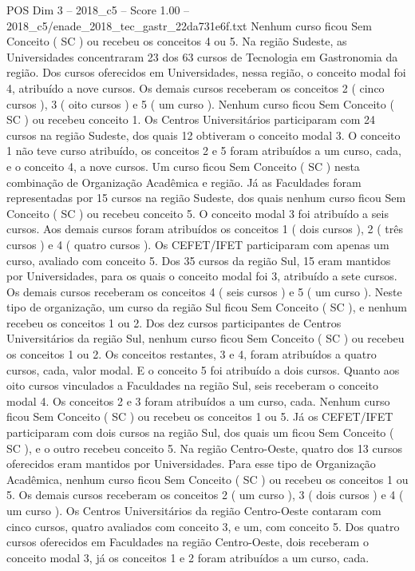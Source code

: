 \begin{textsample}{POS Dim 3 – 2018\_c5 – Score 1.00 – 2018\_c5/enade\_2018\_tec\_gastr\_22da731e6f.txt}
Nenhum curso ficou Sem Conceito ( SC ) ou recebeu os conceitos 4 ou 5.
Na região Sudeste, as Universidades concentraram 23 dos 63 cursos de Tecnologia em Gastronomia da região.
Dos cursos oferecidos em Universidades, nessa região, o conceito modal foi 4, atribuído a nove cursos.
Os demais cursos receberam os conceitos 2 ( cinco cursos ), 3 ( oito cursos ) e 5 ( um curso ).
Nenhum curso ficou Sem Conceito ( SC ) ou recebeu conceito 1.
Os Centros Universitários participaram com 24 cursos na região Sudeste, dos quais 12 obtiveram o conceito modal 3.
O conceito 1 não teve curso atribuído, os conceitos 2 e 5 foram atribuídos a um curso, cada, e o conceito 4, a nove cursos.
Um curso ficou Sem Conceito ( SC ) nesta combinação de Organização Acadêmica e região.
Já as Faculdades foram representadas por 15 cursos na região Sudeste, dos quais nenhum curso ficou Sem Conceito ( SC ) ou recebeu conceito 5.
O conceito modal 3 foi atribuído a seis cursos.
Aos demais cursos foram atribuídos os conceitos 1 ( dois cursos ), 2 ( três cursos ) e 4 ( quatro cursos ).
Os CEFET/IFET participaram com apenas um curso, avaliado com conceito 5.
Dos 35 cursos da região Sul, 15 eram mantidos por Universidades, para os quais o conceito modal foi 3, atribuído a sete cursos.
Os demais cursos receberam os conceitos 4 ( seis cursos ) e 5 ( um curso ).
Neste tipo de organização, um curso da região Sul ficou Sem Conceito ( SC ), e nenhum recebeu os conceitos 1 ou 2.
Dos dez cursos participantes de Centros Universitários da região Sul, nenhum curso ficou Sem Conceito ( SC ) ou recebeu os conceitos 1 ou 2.
Os conceitos restantes, 3 e 4, foram atribuídos a quatro cursos, cada, valor modal.
E o conceito 5 foi atribuído a dois cursos.
Quanto aos oito cursos vinculados a Faculdades na região Sul, seis receberam o conceito modal 4.
Os conceitos 2 e 3 foram atribuídos a um curso, cada.
Nenhum curso ficou Sem Conceito ( SC ) ou recebeu os conceitos 1 ou 5.
Já os CEFET/IFET participaram com dois cursos na região Sul, dos quais um ficou Sem Conceito ( SC ), e o outro recebeu conceito 5.
Na região Centro-Oeste, quatro dos 13 cursos oferecidos eram mantidos por Universidades.
Para esse tipo de Organização Acadêmica, nenhum curso ficou Sem Conceito ( SC ) ou recebeu os conceitos 1 ou 5.
Os demais cursos receberam os conceitos 2 ( um curso ), 3 ( dois cursos ) e 4 ( um curso ).
Os Centros Universitários da região Centro-Oeste contaram com cinco cursos, quatro avaliados com conceito 3, e um, com conceito 5.
Dos quatro cursos oferecidos em Faculdades na região Centro-Oeste, dois receberam o conceito modal 3, já os conceitos 1 e 2 foram atribuídos a um curso, cada.

\end{textsample}
